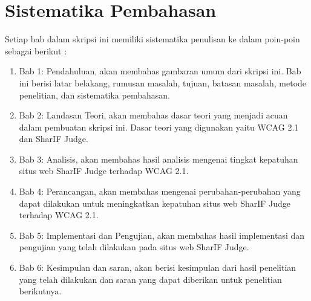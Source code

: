 \section{Sistematika Pembahasan}
\label{sec:sispem}
Setiap bab dalam skripsi ini memiliki sistematika penulisan ke dalam poin-poin sebagai berikut :

\begin{enumerate}
	\item Bab 1: Pendahuluan, akan membahas gambaran umum dari skripsi ini. Bab ini berisi latar
	belakang, rumusan masalah, tujuan, batasan masalah, metode penelitian, dan sistematika
	pembahasan.
	\item Bab 2: Landasan Teori, akan membahas dasar teori yang menjadi acuan dalam pembuatan
	skripsi ini. Dasar teori yang digunakan yaitu WCAG 2.1 dan SharIF Judge.
	\item Bab 3: Analisis, akan membahas hasil analisis mengenai tingkat kepatuhan situs web SharIF Judge terhadap WCAG 2.1.

	\item Bab 4: Perancangan, akan membahas mengenai perubahan-perubahan yang dapat dilakukan
	untuk meningkatkan kepatuhan situs web SharIF Judge terhadap WCAG 2.1.
	\item Bab 5: Implementasi dan Pengujian, akan membahas hasil implementasi dan pengujian yang
	telah dilakukan pada situs web SharIF Judge.
	\item Bab 6: Kesimpulan dan saran, akan berisi kesimpulan dari hasil penelitian yang telah dilakukan
	dan saran yang dapat diberikan untuk penelitian berikutnya.
\end{enumerate}